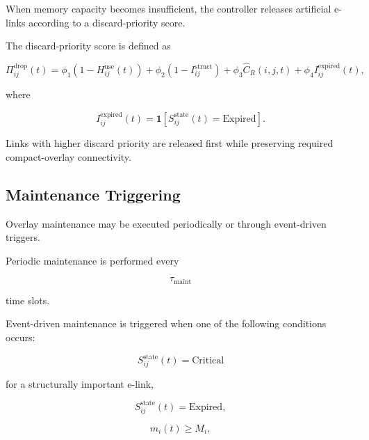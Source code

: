 When memory capacity becomes insufficient, the controller releases artificial e-links according to a discard-priority score.

The discard-priority score is defined as

\begin{equation}
    \Pi_{ij}^{\mathrm{drop}}(t)
    =
    \phi_1
    \left(
    1-H_{ij}^{\mathrm{use}}(t)
    \right)
    +
    \phi_2
    \left(
    1-I_{ij}^{\mathrm{struct}}
    \right)
    +
    \phi_3
    \widehat{C}_{R}(i,j,t)
    +
    \phi_4
    I_{ij}^{\mathrm{expired}}(t),
\end{equation}

where

\begin{equation}
    I_{ij}^{\mathrm{expired}}(t)
    =
    \mathbf{1}
    \left[
    S_{ij}^{\mathrm{state}}(t)
    =
    \mathrm{Expired}
    \right].
\end{equation}

Links with higher discard priority are released first while preserving required compact-overlay connectivity.


\subsection{Maintenance Triggering}

Overlay maintenance may be executed periodically or through event-driven triggers.

Periodic maintenance is performed every

\begin{equation}
    \tau_{\mathrm{maint}}
\end{equation}

time slots.

Event-driven maintenance is triggered when one of the following conditions occurs:

\begin{equation}
    S_{ij}^{\mathrm{state}}(t)
    =
    \mathrm{Critical}
\end{equation}

for a structurally important e-link,

\begin{equation}
    S_{ij}^{\mathrm{state}}(t)
    =
    \mathrm{Expired},
\end{equation}

\begin{equation}
    m_i(t)
    \geq
    M_i,
\end{equation}

